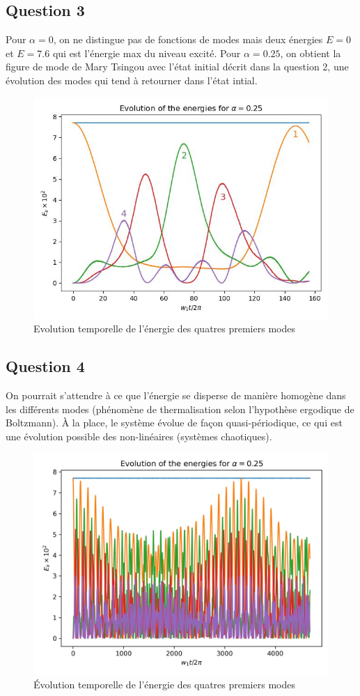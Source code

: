 \documentclass[a4paper, 11pt]{article}
\begin{document}
\subsection*{Question 3}
Pour $\alpha=0$, on ne distingue pas de fonctions de modes mais deux énergies $E=0$ et $E=7.6$ qui est l'énergie max du niveau excité. 
Pour $\alpha=0.25$, on obtient la figure de mode de Mary Tsingou avec l'état initial décrit dans la question 2, une évolution des modes qui tend à retourner dans l'état intial.
\begin{figure}[H]
    \centering
    \includegraphics[width=0.7\linewidth]{pics/fput_0.25.jpg}
    \caption{Evolution temporelle de l'énergie des quatres premiers modes}
    \label{fig:Q3}
\end{figure}

\subsection*{Question 4}
On pourrait s'attendre à ce que l'énergie se disperse de manière homogène dans les différents modes (phénomène de thermalisation selon l'hypothèse ergodique de Boltzmann). À la place, le système évolue de façon quasi-périodique, ce qui est une évolution possible des non-linéaires (systèmes chaotiques).
\begin{figure}[H]
    \centering
    \includegraphics[width=0.7\linewidth]{pics/fput_long.jpg}
    \caption{Évolution temporelle de l'énergie des quatres premiers modes}
    \label{fig:Q4}
\end{figure}
\end{document}

